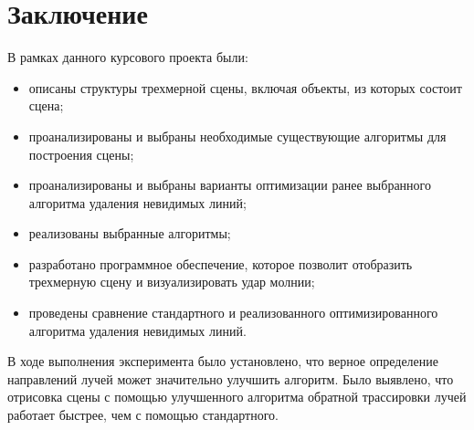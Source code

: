 \chapter*{Заключение}

В рамках данного курсового проекта были:%

\begin{itemize}
	\item описаны структуры трехмерной сцены, включая объекты, из которых состоит сцена;
	\item проанализированы и выбраны необходимые существующие алгоритмы для построения сцены;
	\item проанализированы и выбраны варианты оптимизации ранее выбранного алгоритма удаления невидимых линий;
	\item реализованы выбранные алгоритмы;
	\item разработано программное обеспечение, которое позволит отобразить трехмерную сцену и визуализировать удар молнии;
	\item проведены сравнение стандартного и реализованного оптимизированного алгоритма удаления невидимых линий.
\end{itemize}
 


В ходе выполнения эксперимента было установлено, что верное определение направлений лучей может значительно улучшить алгоритм. Было выявлено, что отрисовка сцены с помощью улучшенного алгоритма обратной трассировки лучей работает быстрее, чем с помощью стандартного. 


